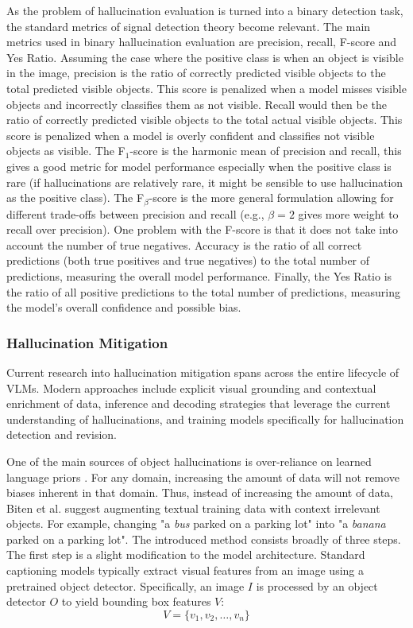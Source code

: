 As the problem of hallucination evaluation is turned into a binary detection task, the standard metrics of signal detection theory become relevant. The main metrics used in binary hallucination evaluation are precision, recall, F-score and Yes Ratio. Assuming the case where the positive class is when an object is visible in the image, precision is the ratio of correctly predicted visible objects to the total predicted visible objects. This score is penalized when a model misses visible objects and incorrectly classifies them as not visible. Recall would then be the ratio of correctly predicted visible objects to the total actual visible objects. This score is penalized when a model is overly confident and classifies not visible objects as visible. The F$_1$-score is the harmonic mean of precision and recall, this gives a good metric for model performance especially when the positive class is rare (if hallucinations are relatively rare, it might be sensible to use hallucination as the positive class). The F$_\beta$-score is the more general formulation allowing for different trade-offs between precision and recall (e.g., $\beta=2$ gives more weight to recall over precision). One problem with the F-score is that it does not take into account the number of true negatives. Accuracy is the ratio of all correct predictions (both true positives and true negatives) to the total number of predictions, measuring the overall model performance. Finally, the Yes Ratio is the ratio of all positive predictions to the total number of predictions, measuring the model's overall confidence and possible bias.


\subsubsection{Hallucination Mitigation}

Current research into hallucination mitigation spans across the entire lifecycle of VLMs. Modern approaches include explicit visual grounding and contextual enrichment of data, inference and decoding strategies that leverage the current understanding of hallucinations, and training models specifically for hallucination detection and revision.

One of the main sources of object hallucinations is over-reliance on learned language priors \autocite{bitenLetThereBe2022}. For any domain, increasing the amount of data will not remove biases inherent in that domain. Thus, instead of increasing the amount of data, Biten et al. \autocite{bitenLetThereBe2022} suggest augmenting textual training data with context irrelevant objects. For example, changing "a \textit{bus} parked on a parking lot" into "a \textit{banana} parked on a parking lot". The introduced method consists broadly of three steps. The first step is a slight modification to the model architecture. Standard captioning models typically extract visual features from an image using a pretrained object detector. Specifically, an image $I$ is processed by an object detector $O$ to yield bounding box features $V$: $$V = \{v_1, v_2, \dots, v_n\}$$

